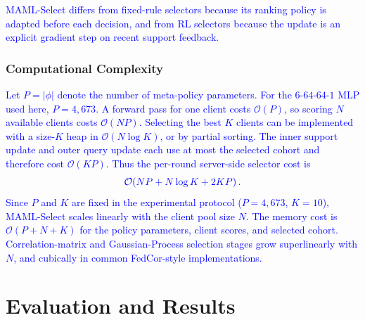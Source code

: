 \documentclass[journal]{IEEEtran}
\newcommand{\revision}[1]{\textcolor{blue}{#1}}
\begin{document}
\revision{MAML-Select differs from fixed-rule selectors because its ranking policy is adapted before each decision, and from RL selectors because the update is an explicit gradient step on recent support feedback.}

\subsubsection{Computational Complexity}
\revision{Let $P=|\phi|$ denote the number of meta-policy parameters. For the $6$-$64$-$64$-$1$ MLP used here, $P=4{,}673$. A forward pass for one client costs $\mathcal{O}(P)$, so scoring $N$ available clients costs $\mathcal{O}(NP)$. Selecting the best $K$ clients can be implemented with a size-$K$ heap in $\mathcal{O}(N\log K)$, or by partial sorting. The inner support update and outer query update each use at most the selected cohort and therefore cost $\mathcal{O}(KP)$. Thus the per-round server-side selector cost is}
\begin{equation}
	\color{blue}
	\mathcal{O}\!\left(NP + N\log K + 2KP\right).
	\label{eq:selector_complexity}
\end{equation}
\revision{Since $P$ and $K$ are fixed in the experimental protocol ($P=4{,}673$, $K=10$), MAML-Select scales linearly with the client pool size $N$. The memory cost is $\mathcal{O}(P+N+K)$ for the policy parameters, client scores, and selected cohort. Correlation-matrix and Gaussian-Process selection stages grow superlinearly with $N$, and cubically in common FedCor-style implementations.}

\section{Evaluation and Results}
\end{document}
